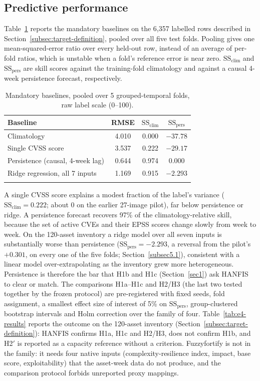 \documentclass[referee,lineno,pdflatex,sn-basic]{sn-jnl}%
\theoremstyle{thmstyleone}%
\theoremstyle{thmstyletwo}%
\theoremstyle{thmstylethree}%
\begin{document}
\subsection{Predictive performance}
\label{subssec4.3}

Table~\ref{tab:e3-baselines} reports the mandatory baselines on the 6{,}357 labelled rows described in
Section~\ref{subsec:target-definition}, pooled over all five test folds. Pooling gives one mean-squared-error ratio over every held-out row, instead of an average of per-fold ratios, which is unstable when a fold's reference error is near zero. $\mathrm{SS}_{\mathrm{clim}}$ and $\mathrm{SS}_{\mathrm{pers}}$ are skill scores
against the training-fold climatology and against a causal 4-week persistence forecast, respectively.

\begin{table}[h]
\caption{Mandatory baselines, pooled over 5 grouped-temporal folds, raw label scale (0--100).}\label{tab:e3-baselines}
\begin{tabular}{@{}lccc@{}}
\toprule
Baseline & RMSE & $\mathrm{SS}_{\mathrm{clim}}$ & $\mathrm{SS}_{\mathrm{pers}}$ \\
\midrule
Climatology & 4.010 & 0.000 & $-37.78$ \\
Single CVSS score & 3.537 & 0.222 & $-29.17$ \\
Persistence (causal, 4-week lag) & 0.644 & 0.974 & 0.000 \\
Ridge regression, all 7 inputs & 1.169 & 0.915 & $-2.293$ \\
\botrule
\end{tabular}
\end{table}


A single CVSS score explains a modest fraction of the label's variance ($\mathrm{SS}_{\mathrm{clim}}=0.222$; about 0 on the earlier 27-image pilot), far below persistence or ridge. A persistence forecast recovers 97\% of the climatology-relative skill, because the set of active CVEs and their EPSS scores change slowly from week to week. On the 120-asset inventory a ridge model over all seven inputs is substantially worse than persistence ($\mathrm{SS}_{\mathrm{pers}}=-2.293$, a reversal from the pilot's $+0.301$, on every one of the five folds; Section~\ref{subsec5.1}), consistent with a linear model over-extrapolating as the inventory grew more heterogeneous. Persistence is therefore the bar that H1b and H1c (Section~\ref{sec1}) ask HANFIS to clear or match. The comparisons H1a--H1c and H2/H3 (the last two tested together by the frozen protocol) are pre-registered with fixed seeds, fold assignment, a smallest effect size of interest of 5\% on $\mathrm{SS}_{\mathrm{pers}}$, group-clustered bootstrap intervals and Holm correction over the family of four. Table~\ref{tab:e4-results} reports the outcome on the 120-asset inventory (Section~\ref{subsec:target-definition}): HANFIS confirms H1a, H1c and H2/H3, does not confirm H1b, and H2$'$ is reported as a capacity reference without a criterion. Fuzzyfortify is not in the family: it needs four native inputs (complexity-resilience index, impact, base score, exploitability) that the asset-week data do not produce, and the comparison protocol forbids unreported proxy mappings.
\end{document}

